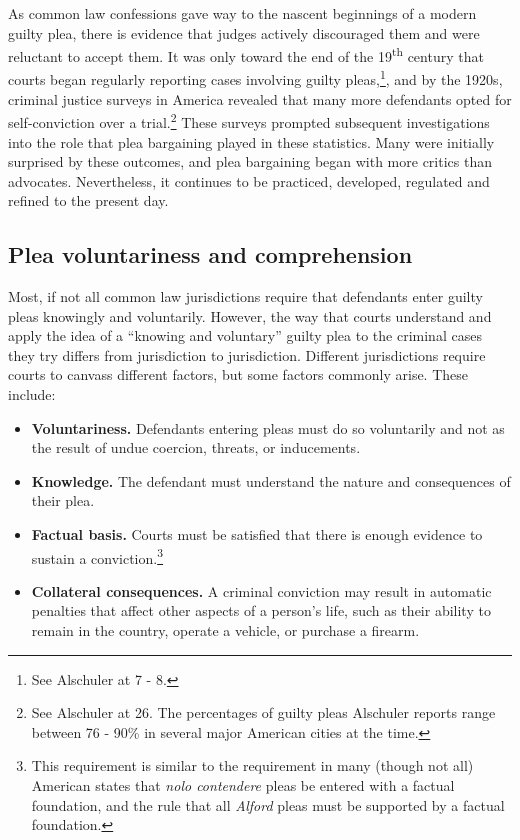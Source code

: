 As common law confessions gave way to the nascent beginnings of a modern guilty plea, there is evidence that judges actively discouraged them and were reluctant to accept them. It was only toward the end of the 19\textsuperscript{th} century that courts began regularly reporting cases involving guilty pleas,\footnote{See Alschuler at 7 - 8.}, and by the 1920s, criminal justice surveys in America revealed that many more defendants opted for self-conviction over a trial.\footnote{See Alschuler at 26. The percentages of guilty pleas Alschuler reports range between 76 - 90\% in several major American cities at the time.} These surveys prompted subsequent investigations into the role that plea bargaining played in these statistics. Many were initially surprised by these outcomes, and plea bargaining began with more critics than advocates. Nevertheless, it continues to be practiced, developed, regulated and refined to the present day.

\subsection{Plea voluntariness and comprehension}

Most, if not all common law jurisdictions require that defendants enter guilty pleas knowingly and voluntarily. However, the way that courts understand and apply the idea of a ``knowing and voluntary'' guilty plea to the criminal cases they try differs from jurisdiction to jurisdiction.  Different jurisdictions require courts to canvass different factors, but some factors commonly arise. These include:

\begin{itemize}
\item \textbf{Voluntariness.} Defendants entering pleas must do so voluntarily and not as the result of undue coercion, threats, or inducements.
\item \textbf{Knowledge.} The defendant must understand the nature and consequences of their plea.
\item \textbf{Factual basis.} Courts must be satisfied that there is enough evidence to sustain a conviction.\footnote{This requirement is similar to the requirement in many (though not all) American states that \textit{nolo contendere} pleas be entered with a factual foundation, and the rule that all \textit{Alford} pleas must be supported by a factual foundation.}
\item \textbf{Collateral consequences.} A criminal conviction may result in automatic penalties that affect other aspects of a person's life, such as their ability to remain in the country, operate a vehicle, or purchase a firearm.
\end{itemize}

